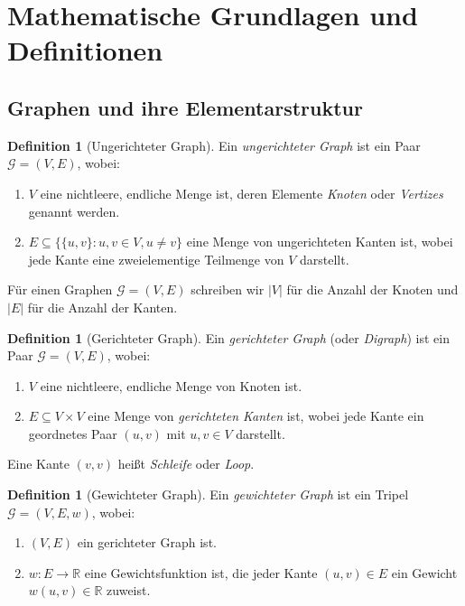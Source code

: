 \documentclass[12pt, a4paper]{article}
\theoremstyle{definition}
\newtheorem{definition}[theorem]{Definition}
\theoremstyle{remark}
\newcommand{\R}{\mathbb{R}}
\newcommand{\Graph}{\mathcal{G}}
\begin{document}
\section{Mathematische Grundlagen und Definitionen}
\label{sec:grundlagen}

\subsection{Graphen und ihre Elementarstruktur}
\label{subsec:graphentheorie}

\begin{definition}[Ungerichteter Graph]
\label{def:graph}
Ein \emph{ungerichteter Graph} ist ein Paar $\Graph = (V, E)$, wobei:
\begin{enumerate}[label=(\alph*)]
  \item $V$ eine nichtleere, endliche Menge ist, deren Elemente \emph{Knoten} oder \emph{Vertizes} genannt werden.
  \item $E \subseteq \{\{u, v\} : u, v \in V, u \neq v\}$ eine Menge von ungerichteten Kanten ist, wobei jede Kante eine zweielementige Teilmenge von $V$ darstellt.
\end{enumerate}
Für einen Graphen $\Graph = (V, E)$ schreiben wir $|V|$ für die Anzahl der Knoten und $|E|$ für die Anzahl der Kanten.
\end{definition}

\begin{definition}[Gerichteter Graph]
\label{def:digraph}
Ein \emph{gerichteter Graph} (oder \emph{Digraph}) ist ein Paar $\Graph = (V, E)$, wobei:
\begin{enumerate}[label=(\alph*)]
  \item $V$ eine nichtleere, endliche Menge von Knoten ist.
  \item $E \subseteq V \times V$ eine Menge von \emph{gerichteten Kanten} ist, wobei jede Kante ein geordnetes Paar $(u, v)$ mit $u, v \in V$ darstellt.
\end{enumerate}
Eine Kante $(v, v)$ heißt \emph{Schleife} oder \emph{Loop}.
\end{definition}

\begin{definition}[Gewichteter Graph]
\label{def:gewichteter_graph}
Ein \emph{gewichteter Graph} ist ein Tripel $\Graph = (V, E, w)$, wobei:
\begin{enumerate}[label=(\alph*)]
  \item $(V, E)$ ein gerichteter Graph ist.
  \item $w: E \to \R$ eine Gewichtsfunktion ist, die jeder Kante $(u, v) \in E$ ein Gewicht $w(u, v) \in \R$ zuweist.
\end{enumerate}
\end{definition}
\end{document}
